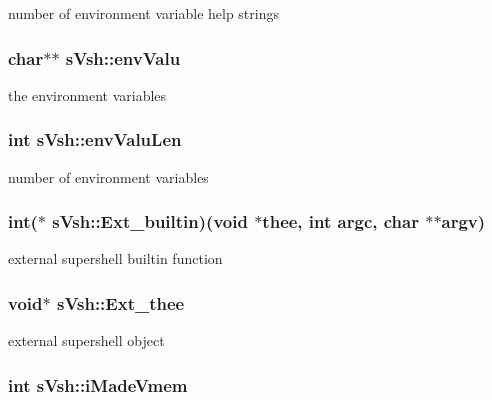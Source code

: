 number of environment variable help strings 

\subsubsection[{envValu}]{\setlength{\rightskip}{0pt plus 5cm}char$\ast$$\ast$ {\bf sVsh::envValu}}\label{a00007_a651413ef7fd726eef389669cff1f3e10}


the environment variables 

\subsubsection[{envValuLen}]{\setlength{\rightskip}{0pt plus 5cm}int {\bf sVsh::envValuLen}}\label{a00007_a6f5d3a3bfe8edef74e14262dca64eb19}


number of environment variables 

\subsubsection[{Ext\_\-builtin}]{\setlength{\rightskip}{0pt plus 5cm}int($\ast$ {\bf sVsh::Ext\_\-builtin})(void $\ast$thee, int argc, char $\ast$$\ast$argv)}\label{a00007_a1ede7298d7d963598ff09330b4dabf65}


external supershell builtin function 

\subsubsection[{Ext\_\-thee}]{\setlength{\rightskip}{0pt plus 5cm}void$\ast$ {\bf sVsh::Ext\_\-thee}}\label{a00007_aca365034a12a00d62f79aea0e74c24c0}


external supershell object 

\subsubsection[{iMadeVmem}]{\setlength{\rightskip}{0pt plus 5cm}int {\bf sVsh::iMadeVmem}}\label{a00007_a4d9333d357f6b00cb9d6a9152835385a}


